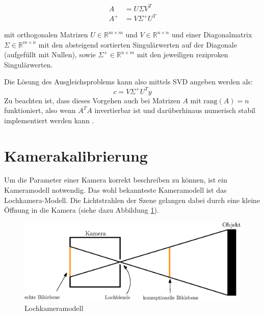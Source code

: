 \[
\begin{aligned}
A &= U\Sigma V^T \\
A^+ &= V\Sigma^+U^T
\end{aligned}
\]

mit orthogonalen Matrizen $U\in\mathbb{R}^{m\times m}$ und $V\in\mathbb{R}^{n\times n}$ und einer Diagonalmatrix $\Sigma\in\mathbb{R}^{m\times n}$ mit den absteigend sortierten Singulärwerten auf der Diagonale (aufgefüllt mit Nullen), sowie $\Sigma^+\in\mathbb{R}^{n\times m}$ mit den jeweiligen reziproken Singulärwerten.


Die Lösung des Ausgleichsproblems kann also mittels SVD angeben werden als:
\[
c = V\Sigma^+U^Ty
\]
Zu beachten ist, dass dieses Vorgehen auch bei Matrizen $A$ mit $\text{rang}\left(A\right) = n$ funktioniert, also wenn $A^TA$ invertierbar ist und darüberhinaus numerisch stabil implementiert werden kann \cite{Stoer2011}.



\section{Kamerakalibrierung}
\label{s:calib}

Um die Parameter einer Kamera korrekt beschreiben zu können, ist ein Kameramodell notwendig. Das wohl bekannteste Kameramodell ist das Lochkamera-Modell. Die Lichtstrahlen der Szene gelangen dabei durch eine kleine Öffnung in die Kamera (siehe dazu Abbildung \ref{fig:pinhole}).
\begin{figure}[!htb]
	\centering
	\includegraphics[scale=.8]{images/pinhole2.eps}
	\caption{Lochkameramodell}
	\label{fig:pinhole}
\end{figure}

